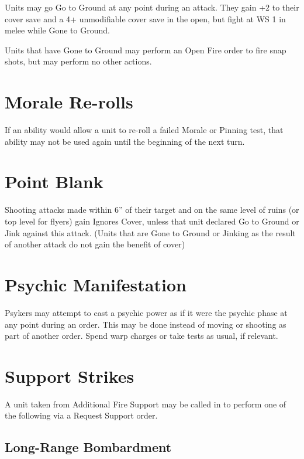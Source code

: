 \documentclass[letterpaper,twocolumn,oneside,titlepage]{book}
\begin{document}
Units may go Go to Ground at any point during an attack. They gain +2 to
their cover save and a 4+ unmodifiable cover save in the open, but fight
at WS 1 in melee while Gone to Ground.

Units that have Gone to Ground may perform an Open Fire order to fire
snap shots, but may perform no other actions.

\section{\texorpdfstring{\textbf{Morale
Re-rolls}}{Morale Re-rolls}}\label{morale-re-rolls}

If an ability would allow a unit to re-roll a failed Morale or Pinning
test, that ability may not be used again until the beginning of the next
turn.

\section{\texorpdfstring{\textbf{Point
Blank}}{Point Blank}}\label{point-blank}

Shooting attacks made within 6'' of their target and on the same level
of ruins (or top level for flyers) gain Ignores Cover, unless that unit
declared Go to Ground or Jink against this attack. (Units that are Gone
to Ground or Jinking as the result of another attack do not gain the
benefit of cover)

\section{\texorpdfstring{\textbf{Psychic
Manifestation}}{Psychic Manifestation}}\label{psychic-manifestation}

Psykers may attempt to cast a psychic power as if it were the psychic
phase at any point during an order. This may be done instead of moving
or shooting as part of another order. Spend warp charges or take tests
as usual, if relevant.

\section{\texorpdfstring{\textbf{Support
Strikes}}{Support Strikes}}\label{support-strikes}

A unit taken from Additional Fire Support may be called in to perform
one of the following via a Request Support order.

\subsection{\texorpdfstring{\textbf{Long-Range
Bombardment}}{Long-Range Bombardment}}\label{long-range-bombardment}
\end{document}
